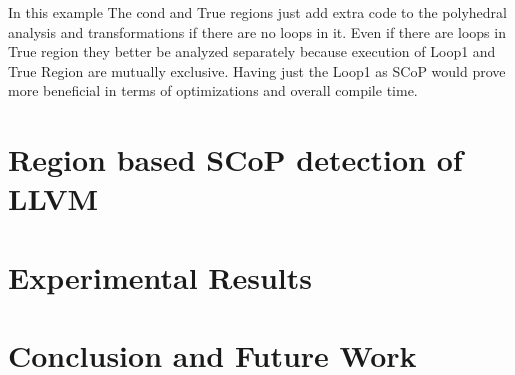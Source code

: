 \documentclass{sigplanconf}
\begin{document}
\begin{comment}
Scop
Cond
|
|--True Region
|
|--False Region
|       | Loop1
|       |
\end{comment}

In this example The cond and True regions just add extra code to the polyhedral analysis and transformations if there
are no loops in it. Even if there are loops in True region they better be analyzed separately because
execution of Loop1 and True Region are mutually exclusive.
Having just the Loop1 as SCoP would prove more beneficial in terms of optimizations and overall compile time.


\section{Region based SCoP detection of LLVM}


\section{Experimental Results}

\section{Conclusion and Future Work}



{\small

}
\end{document}
